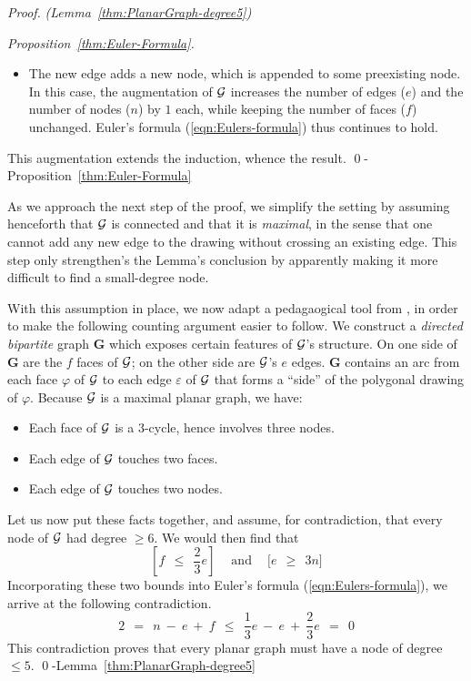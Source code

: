 \begin{proof} {\em (Lemma~\ref{thm:PlanarGraph-degree5})}
\begin{proof} [Proposition~\ref{thm:Euler-Formula}]
\begin{itemize}
\item
The new edge adds a new node, which is appended to some preexisting
node.  In this case, the augmentation of $\mbox{$\cal G$}$ increases the number of
edges ($e$) and the number of nodes ($n$) by $1$ each, while keeping
the number of faces ($f$) unchanged.  Euler's formula
(\ref{eqn:Eulers-formula}) thus continues to hold.
\end{itemize}
This augmentation extends the induction, whence the result.
\qed-Proposition~\ref{thm:Euler-Formula}
\end{proof}

\medskip

As we approach the next step of the proof, we simplify the setting by
assuming henceforth that $\mbox{$\cal G$}$ is connected and that it is {\em
  maximal},  in the sense that one cannot
add any new edge to the drawing without crossing an existing edge.
This step only strengthen's the Lemma's conclusion by apparently
making it more difficult to find a small-degree node.

With this assumption in place, we now adapt a pedagaogical tool from
\cite{Berge73}, in order to make the following counting argument
easier to follow.  We construct a {\em directed bipartite} graph {\bf
  G} which exposes certain features of $\mbox{$\cal G$}$'s structure.  On one side
of {\bf G} are the $f$ faces of $\mbox{$\cal G$}$; on the other side are $\mbox{$\cal G$}$'s $e$
edges.  {\bf G} contains an arc from each face $\varphi$ of $\mbox{$\cal G$}$ to
each edge $\varepsilon$ of $\mbox{$\cal G$}$ that forms a ``side'' of the polygonal
drawing of $\varphi$.  Because $\mbox{$\cal G$}$ is a maximal planar graph, we have:
\begin{itemize}
\item
Each face of $\mbox{$\cal G$}$ is a $3$-cycle, hence involves three nodes.
\item
Each edge of $\mbox{$\cal G$}$ touches two faces.
\item
Each edge of $\mbox{$\cal G$}$ touches two nodes.
\end{itemize}

Let us now put these facts together, and assume, for contradiction,
that every node of $\mbox{$\cal G$}$ had degree $\geq 6$.  We would then find that
\[
\left[ f \ \ \leq \ \ \frac{2}{3} e \right] \ \ \ \ \mbox{ and } \ \ \ \
\Big[ e \ \ \geq \ \ 3n \Big]
\]
Incorporating these two bounds into Euler's formula
(\ref{eqn:Eulers-formula}), we arrive at the following contradiction.
\[ 2 \ \ = \ \ n \ - \ e \  + \ f
\ \ \leq \ \ \frac{1}{3} e \ - \ e \ + \ \frac{2}{3} e \ \ = \ \ 0
\]
This contradiction proves that every planar graph must have a node of
degree $\leq 5$.
 \qed-Lemma~\ref{thm:PlanarGraph-degree5}
\end{proof}

